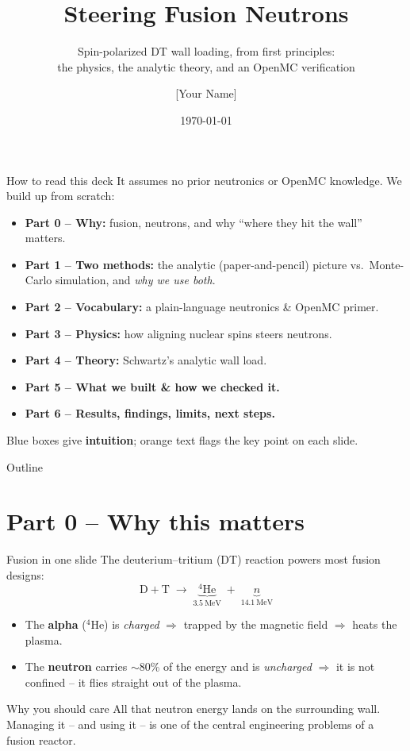 \documentclass[aspectratio=169]{beamer}
\title[Spin-polarized fusion NWL]{Steering Fusion Neutrons}
\subtitle{Spin-polarized DT wall loading, from first principles:\\ the physics, the analytic theory, and an OpenMC verification}
\author[SPF source project]{[Your Name]}
\institute[]{A self-contained learning deck \\ \small (companion to the \texttt{spf\_prototype} OpenMC source)}
\date{\today}
\newcommand{\keyword}[1]{\textcolor{blue!60!black}{\textbf{#1}}}
\begin{document}
\begin{frame}[plain]\titlepage\end{frame}

\begin{frame}{How to read this deck}
  It assumes \alert{no prior neutronics or OpenMC knowledge}. We build up from scratch:
  \begin{itemize}
    \item \keyword{Part 0 -- Why:} fusion, neutrons, and why ``where they hit the wall'' matters.
    \item \keyword{Part 1 -- Two methods:} the analytic (paper-and-pencil) picture vs.\ Monte-Carlo simulation, and \emph{why we use both}.
    \item \keyword{Part 2 -- Vocabulary:} a plain-language neutronics \& OpenMC primer.
    \item \keyword{Part 3 -- Physics:} how aligning nuclear spins steers neutrons.
    \item \keyword{Part 4 -- Theory:} Schwartz's analytic wall load.
    \item \keyword{Part 5 -- What we built \& how we checked it.}
    \item \keyword{Part 6 -- Results, findings, limits, next steps.}
  \end{itemize}
  \vfill
  \footnotesize Blue boxes give \keyword{intuition}; orange text flags the \alert{key point} on each slide.
\end{frame}

\begin{frame}{Outline}\tableofcontents\end{frame}

\section{Part 0 -- Why this matters}
\begin{frame}{Fusion in one slide}
  The deuterium--tritium (DT) reaction powers most fusion designs:
  \[
    \mathrm{D} + \mathrm{T} \;\longrightarrow\; \underbrace{{}^4\mathrm{He}}_{3.5\ \mathrm{MeV}} \;+\; \underbrace{n}_{14.1\ \mathrm{MeV}}
  \]
  \begin{itemize}
    \item The \keyword{alpha} (${}^4$He) is \emph{charged} $\Rightarrow$ trapped by the magnetic field $\Rightarrow$ heats the plasma.
    \item The \keyword{neutron} carries \alert{$\sim$80\% of the energy} and is \emph{uncharged} $\Rightarrow$ it is \alert{not confined} -- it flies straight out of the plasma.
  \end{itemize}
  \vfill
  \begin{block}{Why you should care}
    All that neutron energy lands on the surrounding wall. Managing it -- and using it -- is one of the central engineering problems of a fusion reactor.
  \end{block}
\end{frame}
\end{document}
